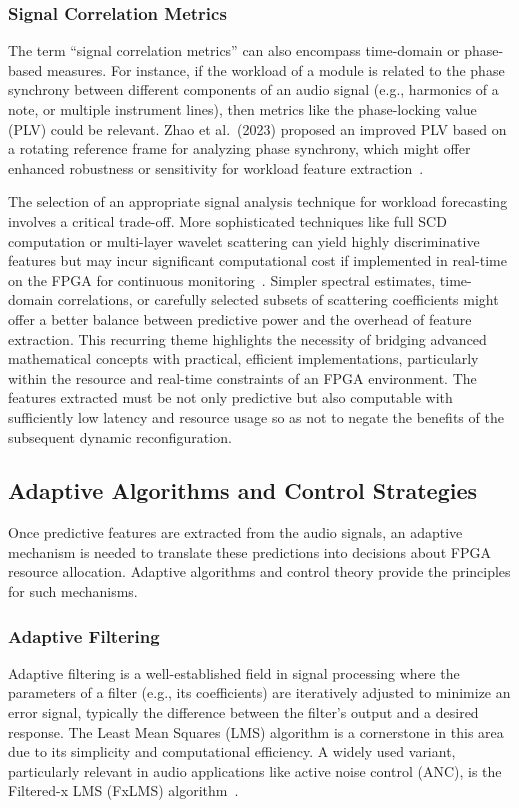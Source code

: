 \subsubsection{Signal Correlation Metrics}
The term ``signal correlation metrics'' can also encompass time-domain or phase-based measures. For instance, if the workload of a module is related to the phase synchrony between different components of an audio signal (e.g., harmonics of a note, or multiple instrument lines), then metrics like the phase-locking value (PLV) could be relevant. Zhao et al.\ (2023) proposed an improved PLV based on a rotating reference frame for analyzing phase synchrony, which might offer enhanced robustness or sensitivity for workload feature extraction~\cite{ref14}.

The selection of an appropriate signal analysis technique for workload forecasting involves a critical trade-off. More sophisticated techniques like full SCD computation or multi-layer wavelet scattering can yield highly discriminative features but may incur significant computational cost if implemented in real-time on the FPGA for continuous monitoring~\cite{ref1}. Simpler spectral estimates, time-domain correlations, or carefully selected subsets of scattering coefficients might offer a better balance between predictive power and the overhead of feature extraction. This recurring theme highlights the necessity of bridging advanced mathematical concepts with practical, efficient implementations, particularly within the resource and real-time constraints of an FPGA environment. The features extracted must be not only predictive but also computable with sufficiently low latency and resource usage so as not to negate the benefits of the subsequent dynamic reconfiguration.

\subsection{Adaptive Algorithms and Control Strategies}

Once predictive features are extracted from the audio signals, an adaptive mechanism is needed to translate these predictions into decisions about FPGA resource allocation. Adaptive algorithms and control theory provide the principles for such mechanisms.

\subsubsection{Adaptive Filtering}
Adaptive filtering is a well-established field in signal processing where the parameters of a filter (e.g., its coefficients) are iteratively adjusted to minimize an error signal, typically the difference between the filter's output and a desired response. The Least Mean Squares (LMS) algorithm is a cornerstone in this area due to its simplicity and computational efficiency. A widely used variant, particularly relevant in audio applications like active noise control (ANC), is the Filtered-x LMS (FxLMS) algorithm~\cite{ref9}.

